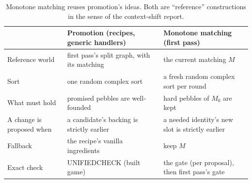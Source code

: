 \begin{table}[H]
\centering\small
\begin{tabularx}{\textwidth}{@{}p{2.8cm}LL@{}}
\toprule
& \textbf{Promotion} (recipes, generic handlers) & \textbf{Monotone matching} (first pass)\\
\midrule
Reference world & first pass's split graph, with its matching & the current matching $M$\\
Sort & one random complex sort & a fresh random complex sort per round\\
What must hold & promised pebbles are well-founded & hard pebbles of $M_0$ are kept\\
A change is proposed when & a candidate's backing is strictly earlier & a needed identity's new slot is strictly earlier\\
Fallback & the recipe's vanilla ingredients & keep $M$\\
Exact check & UNIFIEDCHECK (built game) & the gate (per proposal), then first pass's gate\\
\bottomrule
\end{tabularx}
\caption{Monotone matching reuses promotion's ideas. Both are ``reference'' constructions in the sense of the context-shift report.}
\label{tab:kinship}
\end{table}
